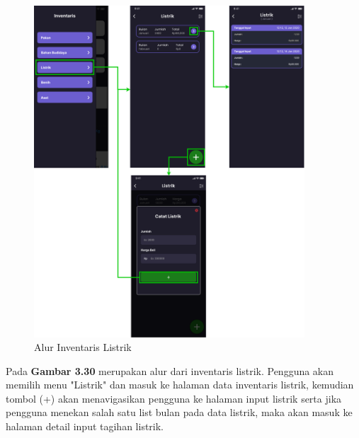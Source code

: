 \begin{spacing}{1.5}
	\begin{figure}[H]
		\centering
		\includegraphics[width=0.9\textwidth]{gambar/sprint2/flow_electric.png}
		\caption{Alur Inventaris Listrik}
	\end{figure}

	Pada \textbf{Gambar 3.30} merupakan alur dari inventaris listrik. Pengguna akan memilih menu "Listrik" dan masuk ke halaman data inventaris listrik, kemudian tombol (+) akan menavigasikan pengguna ke halaman input listrik serta jika pengguna menekan salah satu list bulan pada data listrik, maka akan masuk ke halaman detail input tagihan listrik.


\end{spacing}
